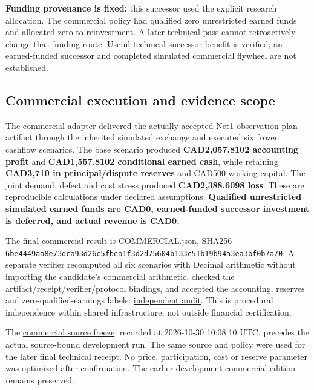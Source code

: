 \documentclass[
  11pt,
]{article}
\begin{document}
\textbf{Funding provenance is fixed:} this successor used the explicit
research allocation. The commercial policy had qualified zero
unrestricted earned funds and allocated zero to reinvestment. A later
technical pass cannot retroactively change that funding route. Useful
technical successor benefit is verified; an earned-funded successor and
completed simulated commercial flywheel are not established.

\hypertarget{commercial-execution-and-evidence-scope}{%
\subsection{Commercial execution and evidence
scope}\label{commercial-execution-and-evidence-scope}}

The commercial adapter delivered the actually accepted Net1
observation-plan artifact through the inherited simulated exchange and
executed six frozen cashflow scenarios. The base scenario produced
\textbf{CAD2,057.8102 accounting profit} and \textbf{CAD1,557.8102
conditional earned cash}, while retaining \textbf{CAD3,710 in
principal/dispute reserves} and CAD500 working capital. The joint
demand, defect and cost stress produced \textbf{CAD2,388.6098 loss}.
These are reproducible calculations under declared assumptions.
\textbf{Qualified unrestricted simulated earned funds are CAD0,
earned-funded successor investment is deferred, and actual revenue is
CAD0.}

The final commercial result is
\href{https://github.com/MontrealAI/AGI-Alpha-Invention-Flywheel-Lab/blob/b0d828309f14ef4dc278dc522739df85db43c460/evidence/next009/commerce/net1-primary-final-v1/artifacts/COMMERCIAL.json}{COMMERCIAL.json},
SHA256
\nolinkurl{6be4449aa8e73dca93d26c5fbea1f3d2d75604b133c51b19b94a3ea3bf0b7a70}.
A separate verifier recomputed all six scenarios with Decimal arithmetic
without importing the candidate's commercial arithmetic, checked the
artifact/receipt/verifier/protocol bindings, and accepted the
accounting, reserves and zero-qualified-earnings labels:
\href{https://github.com/MontrealAI/AGI-Alpha-Invention-Flywheel-Lab/blob/b0d828309f14ef4dc278dc522739df85db43c460/evidence/next009/verification/commercial-audit/artifacts/AUDIT.json}{independent
audit}. This is procedural independence within shared infrastructure,
not outside financial certification.

The
\href{https://github.com/MontrealAI/AGI-Alpha-Invention-Flywheel-Lab/blob/b0d828309f14ef4dc278dc522739df85db43c460/research/next009/commerce/SOURCE_FREEZE.json}{commercial
source freeze}, recorded at 2026-10-30 10:08:10 UTC, precedes the actual
source-bound development run. The same source and policy were used for
the later final technical receipt. No price, participation, cost or
reserve parameter was optimized after confirmation. The earlier
\href{https://github.com/MontrealAI/AGI-Alpha-Invention-Flywheel-Lab/blob/b0d828309f14ef4dc278dc522739df85db43c460/evidence/next009/archives/commerce-r1.manifest.json}{development
commercial edition} remains preserved.
\end{document}

